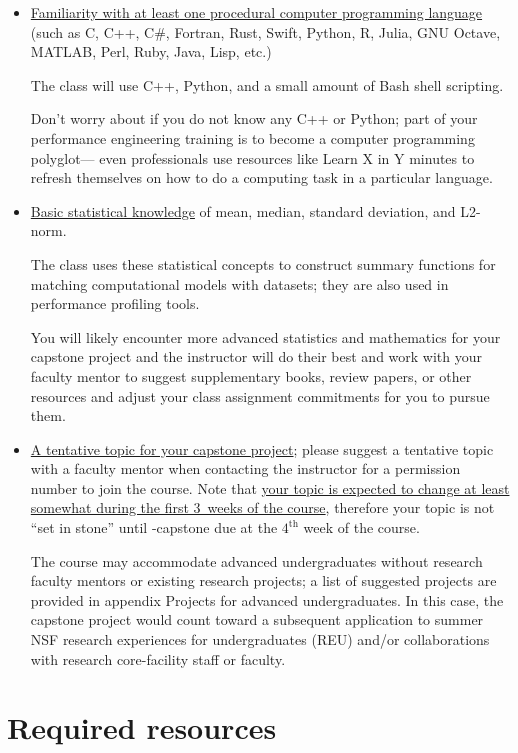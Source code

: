 \documentclass[12pt]{article}
\begin{document}
\begin{itemize}
\item \ul{Familiarity with at least one %
  procedural computer programming language} %
  (such as C, C++, C\#, Fortran, Rust, Swift, %
  Python, R, Julia, GNU Octave, MATLAB, %
  Perl, Ruby, Java, Lisp, etc.)

  The class will use C++, Python, and %
  a small amount of Bash shell scripting.

  Don't worry about if you do not know any C++ or Python; %
  part of your performance engineering training %
  is to become a computer programming polyglot---%
  even professionals use resources like Learn X in Y minutes %
  to refresh themselves on how to do a computing task in a particular language.
\item \ul{Basic statistical knowledge} %
  of mean, median, standard deviation, and L2-norm.

  The class uses these statistical concepts to construct %
  summary functions for matching computational models with datasets; %
  they are also used in performance profiling tools.

  You will likely encounter more advanced statistics and mathematics %
  for your capstone project %
  and the instructor will do their best and work with your faculty mentor %
  to suggest supplementary books, review papers, or other resources %
  and adjust your class assignment commitments for you to pursue them.
\item \ul{A tentative topic for your capstone project}; %
  please suggest a tentative topic with a faculty mentor when %
  contacting the instructor for a permission number to join the course.
  Note that %
  \ul{your topic is expected to change at least somewhat %
  during the first 3~weeks of the course}, %
  therefore your topic is not ``set in stone'' until -capstone %
  due at the $4^{\mathrm{th}}$ week of the course.

  The course may accommodate advanced undergraduates %
  without research faculty mentors %
  or existing research projects; %
  a list of suggested projects are provided in %
  appendix  Projects for advanced undergraduates.
  In this case, %
  the capstone project would count toward a subsequent application to %
  summer NSF research experiences for undergraduates (REU) %
  and/or collaborations with research core-facility staff or faculty.
\end{itemize}

\section{Required resources}
\end{document}

